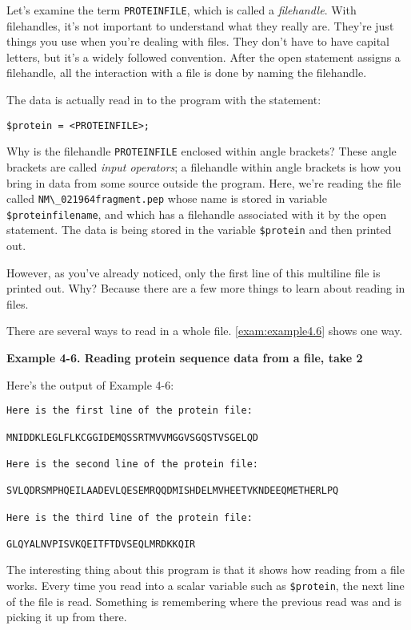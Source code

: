 Let's examine the term \verb|PROTEINFILE|, which is called a \textit{filehandle}. With filehandles, it's not important to understand what they really are.  They're just things you use when you're dealing with files. They don't have to have capital letters, but it's a widely followed convention.  After the open statement assigns a filehandle, all the interaction with a file is done by naming the filehandle.  

The data is actually read in to the program with the statement:

\begin{lstlisting}
$protein = <PROTEINFILE>;
\end{lstlisting}

Why is the filehandle \verb|PROTEINFILE| enclosed within angle brackets? These angle brackets are called \textit{input operators}; a filehandle within angle brackets is how you bring in data from some source outside the program.  Here, we're reading the file called \verb|NM\_021964fragment.pep| whose name is stored in variable \verb|$proteinfilename|, and which has a filehandle associated with it by the open statement. The data is being stored in the variable \verb|$protein| and then printed out.

However, as you've already noticed, only the first line of this multiline file is printed out. Why? Because there are a few more things to learn about reading in files.

There are several ways to read in a whole file. \autoref{exam:example4.6} shows one way.

\textbf{Example 4-6. Reading protein sequence data from a file, take 2}



Here's the output of Example 4-6:

\begin{lstlisting}
Here is the first line of the protein file:

MNIDDKLEGLFLKCGGIDEMQSSRTMVVMGGVSGQSTVSGELQD

Here is the second line of the protein file:

SVLQDRSMPHQEILAADEVLQESEMRQQDMISHDELMVHEETVKNDEEQMETHERLPQ

Here is the third line of the protein file:

GLQYALNVPISVKQEITFTDVSEQLMRDKKQIR
\end{lstlisting}

The interesting thing about this program is that it shows how reading from a file works. Every time you read into a scalar variable such as \verb|$protein|, the next line of the file is read. Something is remembering where the previous read was and is picking it up from there.

